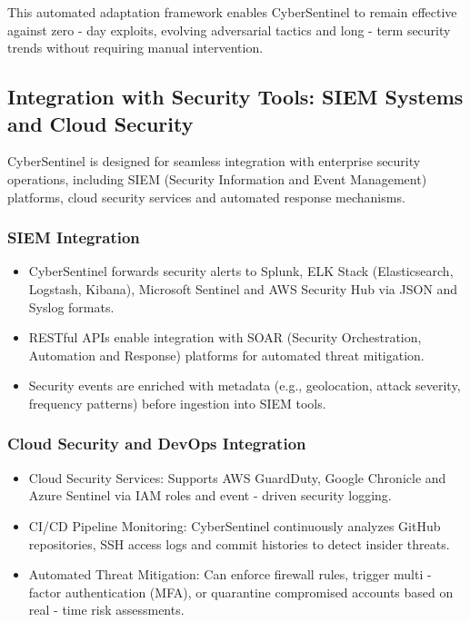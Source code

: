 \documentclass{article}
\begin{document}
This automated adaptation framework enables CyberSentinel to remain effective against zero - day exploits, evolving adversarial tactics and long - term security trends without requiring manual intervention.

\subsection{Integration with Security Tools: SIEM Systems and Cloud Security}

CyberSentinel is designed for seamless integration with enterprise security operations, including SIEM (Security Information and Event Management) platforms, cloud security services and automated response mechanisms.

\subsubsection{SIEM Integration}
\begin{itemize}
    \item CyberSentinel forwards security alerts to Splunk, ELK Stack (Elasticsearch, Logstash, Kibana), Microsoft Sentinel and AWS Security Hub via JSON and Syslog formats.
    \item RESTful APIs enable integration with SOAR (Security Orchestration, Automation and Response) platforms for automated threat mitigation.
    \item Security events are enriched with metadata (e.g., geolocation, attack severity, frequency patterns) before ingestion into SIEM tools.
\end{itemize}

\subsubsection{Cloud Security and DevOps Integration}
\begin{itemize}
    \item Cloud Security Services: Supports AWS GuardDuty, Google Chronicle and Azure Sentinel via IAM roles and event - driven security logging.
    \item CI/CD Pipeline Monitoring: CyberSentinel continuously analyzes GitHub repositories, SSH access logs and commit histories to detect insider threats.
    \item Automated Threat Mitigation: Can enforce firewall rules, trigger multi - factor authentication (MFA), or quarantine compromised accounts based on real - time risk assessments.
\end{itemize}
\end{document}

